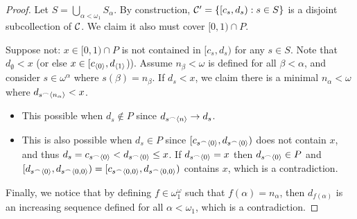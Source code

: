 \begin{proof}
  Let $S = \bigcup_{\alpha<\omega_1} S_\alpha$. By construction, $\mathcal{C}' = \{[c_s,d_s) : s\in S\}$ is a disjoint subcollection of $\mathcal{C}$. We claim it also must cover $[0,1)\cap P$.

  Suppose not: $x\in[0,1)\cap P$ is not contained in $[c_s,d_s)$ for any $s\in S$. Note that $d_\emptyset<x$ (or else $x\in[c_{\langle0\rangle},d_{\langle1\rangle}$)). Assume $n_\beta<\omega$ is defined for all $\beta<\alpha$, and consider $s\in\omega^\alpha$ where $s(\beta)=n_\beta$. If $d_s<x$, we claim there is a minimal $n_\alpha<\omega$ where $d_{s^\frown\langle n_\alpha\rangle}<x$.
    \begin{itemize}
      \item This possible when $d_s\not\in P$ since $d_{s^\frown\langle n\rangle}\to d_s$.
      \item This is also possible when $d_s\in P$ since $[c_{s^\frown\langle0\rangle},d_{s^\frown\langle0\rangle})$ does not contain $x$, and thus $d_s=c_{s^\frown\langle0\rangle}<d_{s^\frown\langle0\rangle}\leq x$. If $d_{s^\frown\langle0\rangle} = x$ then $d_{s^\frown\langle0\rangle}\in P$ and $[d_{s^\frown\langle0\rangle},d_{s^\frown\langle0,0\rangle})=[c_{s^\frown\langle0,0\rangle},d_{s^\frown\langle0,0\rangle})$ contains $x$, which is a contradiction.
    \end{itemize}

  Finally, we notice that by defining $f\in\omega^\omega_1$ such that $f(\alpha)=n_\alpha$, then $d_{f(\alpha)}$ is an increasing sequence defined for all $\alpha<\omega_1$, which is a contradiction.
\end{proof}

